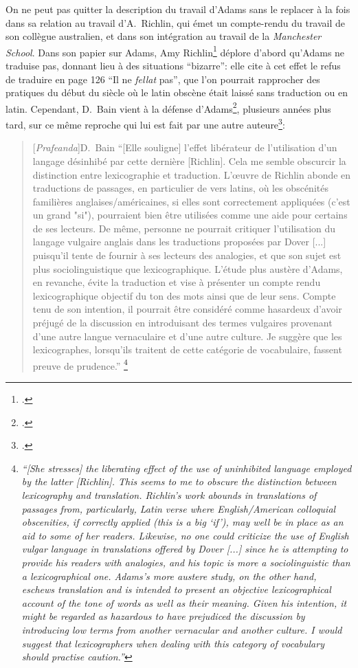 On ne peut pas quitter la description du travail d'Adams sans le replacer à la fois dans sa relation au travail d'A.~Richlin, qui émet un compte-rendu du travail de son collègue australien, et dans son intégration au travail de la \textit{Manchester School}. Dans son papier sur Adams, Amy Richlin\footcite{richlin1984latin} déplore d'abord qu'Adams ne traduise pas, donnant lieu à des situations \enquote{bizarre}: elle cite à cet effet le refus de traduire en page 126 \enquote{Il ne \textit{fellat} pas}, que l'on pourrait rapprocher des pratiques du début du siècle où le latin obscène était laissé sans traduction ou en latin. Cependant, D.~Bain vient à la défense d'Adams\footcite[p.~408]{bain2014praefanda}, plusieurs années plus tard, sur ce même reproche qui lui est fait par une autre auteure\footcite{braund2002personal}:
\begin{quote}[\textit{Prafeanda}]{D.~Bain}
    \enquote{[Elle souligne] l'effet libérateur de l'utilisation d'un langage désinhibé par cette dernière [Richlin]. Cela me semble obscurcir la distinction entre lexicographie et traduction. L'œuvre de Richlin abonde en traductions de passages, en particulier de vers latins, où les obscénités familières anglaises/américaines, si elles sont correctement appliquées (c'est un grand "si"), pourraient bien être utilisées comme une aide pour certains de ses lecteurs. De même, personne ne pourrait critiquer l'utilisation du langage vulgaire anglais dans les traductions proposées par Dover [...] puisqu'il tente de fournir à ses lecteurs des analogies, et que son sujet est plus sociolinguistique que lexicographique. L'étude plus austère d'Adams, en revanche, évite la traduction et vise à présenter un compte rendu lexicographique objectif du ton des mots ainsi que de leur sens. Compte tenu de son intention, il pourrait être considéré comme hasardeux d'avoir préjugé de la discussion en introduisant des termes vulgaires provenant d'une autre langue vernaculaire et d'une autre culture. Je suggère que les lexicographes, lorsqu'ils traitent de cette catégorie de vocabulaire, fassent preuve de prudence.}%
    \footnote{\textit{\enquote{[She stresses] the liberating effect of the use of uninhibited language employed by the latter [Richlin]. This seems to me to obscure the distinction between lexicography and translation. Richlin’s work abounds in translations of passages from, particularly, Latin verse where English/American colloquial obscenities, if correctly applied (this is a big ‘if’), may well be in place as an aid to some of her readers. Likewise, no one could criticize the use of English vulgar language in translations offered by Dover [...] since he is attempting to provide his readers with analogies, and his topic is more a sociolinguistic than a lexicographical one. Adams’s more austere study, on the other hand, eschews translation and is intended to present an objective lexicographical account of the tone of words as well as their meaning. Given his intention, it might be regarded as hazardous to have prejudiced the discussion by introducing low terms from another vernacular and another culture. I would suggest that lexicographers when dealing with this category of vocabulary should practise caution.}}}
\end{quote}

